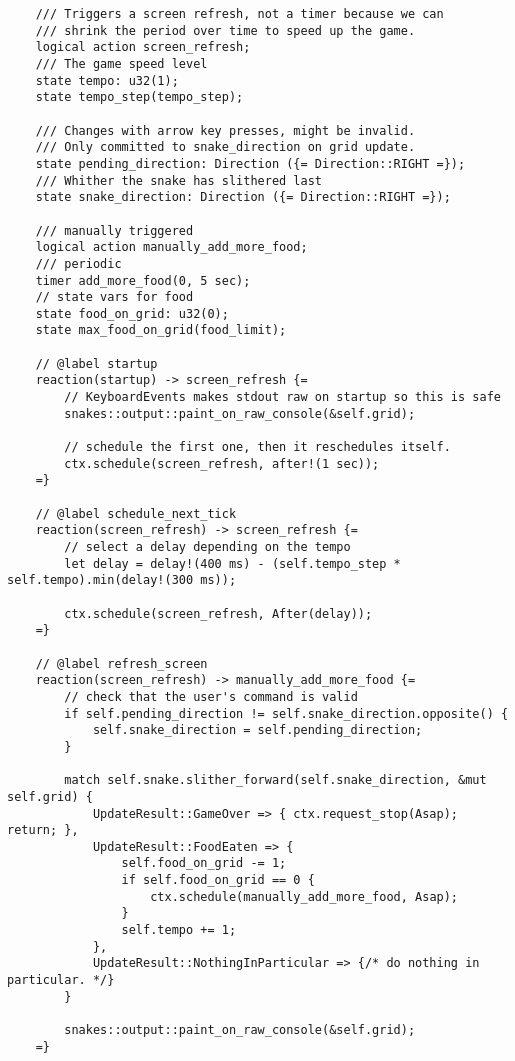 \documentclass{article}
\begin{document}
\begin{verbatim}
    /// Triggers a screen refresh, not a timer because we can
    /// shrink the period over time to speed up the game.
    logical action screen_refresh;
    /// The game speed level
    state tempo: u32(1);
    state tempo_step(tempo_step);

    /// Changes with arrow key presses, might be invalid.
    /// Only committed to snake_direction on grid update.
    state pending_direction: Direction ({= Direction::RIGHT =});
    /// Whither the snake has slithered last
    state snake_direction: Direction ({= Direction::RIGHT =});

    /// manually triggered
    logical action manually_add_more_food;
    /// periodic
    timer add_more_food(0, 5 sec);
    // state vars for food
    state food_on_grid: u32(0);
    state max_food_on_grid(food_limit);

    // @label startup
    reaction(startup) -> screen_refresh {=
        // KeyboardEvents makes stdout raw on startup so this is safe
        snakes::output::paint_on_raw_console(&self.grid);

        // schedule the first one, then it reschedules itself.
        ctx.schedule(screen_refresh, after!(1 sec));
    =}

    // @label schedule_next_tick
    reaction(screen_refresh) -> screen_refresh {=
        // select a delay depending on the tempo
        let delay = delay!(400 ms) - (self.tempo_step * self.tempo).min(delay!(300 ms));

        ctx.schedule(screen_refresh, After(delay));
    =}

    // @label refresh_screen
    reaction(screen_refresh) -> manually_add_more_food {=
        // check that the user's command is valid
        if self.pending_direction != self.snake_direction.opposite() {
            self.snake_direction = self.pending_direction;
        }

        match self.snake.slither_forward(self.snake_direction, &mut self.grid) {
            UpdateResult::GameOver => { ctx.request_stop(Asap); return; },
            UpdateResult::FoodEaten => {
                self.food_on_grid -= 1;
                if self.food_on_grid == 0 {
                    ctx.schedule(manually_add_more_food, Asap);
                }
                self.tempo += 1;
            },
            UpdateResult::NothingInParticular => {/* do nothing in particular. */}
        }

        snakes::output::paint_on_raw_console(&self.grid);
    =}


\end{verbatim}
\end{document}
